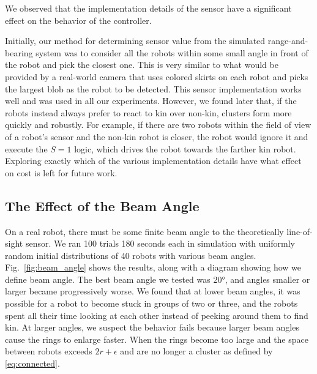 \documentclass[letterpaper, 10 pt, conference]{ieeeconf}
\begin{document}
We observed that the implementation details of the sensor have a significant
effect on the behavior of the controller.

Initially, our method for determining sensor value from the simulated
range-and-bearing system was to consider all the robots within some small angle
in front of the robot and pick the closest one. This is very similar to what
would be provided by a real-world camera that uses colored skirts on each robot
and picks the largest blob as the robot to be detected. This sensor
implementation works well and was used in all our experiments. However,
we found later that, if the robots instead always prefer to react to kin over
non-kin, clusters form more quickly and robustly. For example, if there are
two robots within the field of view of a robot's sensor and the non-kin robot is
closer, the robot would ignore it and execute the $S=1$ logic, which drives the
robot towards the farther kin robot. Exploring exactly which of the various
implementation details have what effect on cost is left for future work.

\subsection{The Effect of the Beam Angle} \label{sec:aperture_angle}

On a real robot, there must be some finite beam angle to the theoretically
line-of-sight sensor. We ran 100 trials 180 seconds each in simulation with uniformly random
initial distributions of 40 robots with various beam
angles. Fig.~\ref{fig:beam_angle} shows the results, along with a diagram
showing how we define beam angle. The best beam angle we tested was \ang{20},
and angles smaller or larger became progressively worse. We found that at lower
beam angles, it was possible for a robot to become stuck in groups of two or
three, and the robots spent all their time looking at each other instead of
peeking around them to find kin. At larger angles, we suspect the behavior fails
because larger beam angles cause the rings to enlarge faster. When the rings become
too large and the space between robots exceeds $2r+\epsilon$
and are no longer a cluster as defined by \eqref{eq:connected}.
\end{document}
